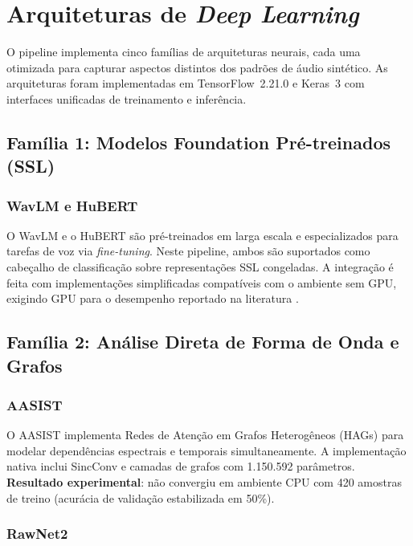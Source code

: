 \documentclass[12pt,a4paper]{article}
\begin{document}
\section{Arquiteturas de \textit{Deep Learning}}
\label{sec:arquiteturas}

O pipeline implementa cinco fam\'{i}lias de arquiteturas neurais, cada uma
otimizada para capturar aspectos distintos dos padr\~{o}es de \'{a}udio
sint\'{e}tico.
As arquiteturas foram implementadas em TensorFlow~2.21.0 e Keras~3 com
interfaces unificadas de treinamento e infer\^{e}ncia.

\subsection{Fam\'{i}lia 1: Modelos Foundation Pr\'{e}-treinados (SSL)}

\subsubsection{WavLM e HuBERT}

O WavLM \cite{chen2022wavlm} e o HuBERT \cite{hsu2021hubert} s\~{a}o
pr\'{e}-treinados em larga escala e especializados para tarefas de voz via
\textit{fine-tuning}.
Neste pipeline, ambos s\~{a}o suportados como cabe\c{c}alho de
classifica\c{c}\~{a}o sobre representa\c{c}\~{o}es SSL congeladas.
A integra\c{c}\~{a}o \'{e} feita com implementa\c{c}\~{o}es simplificadas
compat\'{i}veis com o ambiente sem GPU, exigindo GPU para o desempenho
reportado na literatura \cite{wang2024asvspoof5}.

\subsection{Fam\'{i}lia 2: An\'{a}lise Direta de Forma de Onda e Grafos}

\subsubsection{AASIST}

O AASIST \cite{jung2022aasist} implementa Redes de Aten\c{c}\~{a}o em Grafos
Heterog\^{e}neos (HAGs) para modelar depend\^{e}ncias espectrais e temporais
simultaneamente.
A implementa\c{c}\~{a}o nativa inclui SincConv e camadas de grafos com
1.150.592 par\^{a}metros.
\textbf{Resultado experimental}: n\~{a}o convergiu em ambiente CPU com
420 amostras de treino (acur\'{a}cia de valida\c{c}\~{a}o estabilizada em
50\%).

\subsubsection{RawNet2}
\end{document}
